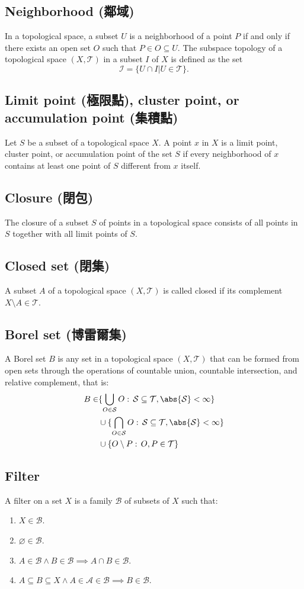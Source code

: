 \documentclass[a4paper,12pt]{article}
\begin{document}
\subsection{Neighborhood (鄰域)}
In a topological space, a subset $U$ is a neighborhood of a point $P$ if and only if there exists an open set $O$ such that $P\in O\subseteq U$.
The subspace topology of a topological space $(X,\mathcal{T})$ in a subset $I$ of $X$ is defined as the set 
\[\mathcal{I}=\{U\cap I | U\in\mathcal{T}\}.\]
\subsection{Limit point (極限點), cluster point, or accumulation point (集積點)}
Let $S$ be a subset of a topological space $X$. A point $x$ in $X$ is a limit point, cluster point, or accumulation point of the set $S$ if every neighborhood of $x$ contains at least one point of $S$ different from $x$ itself.
\subsection{Closure (閉包)}
The closure of a subset $S$ of points in a topological space consists of all points in $S$ together with all limit points of $S$.
\subsection{Closed set (閉集)}
A subset $A$ of a topological space $(X,\mathcal{T})$ is called closed if its complement $X\setminus A\in\mathcal{T}$.
\subsection{Borel set (博雷爾集)}
A Borel set $B$ is any set in a topological space $(X,\mathcal{T})$ that can be formed from open sets through the operations of countable union, countable intersection, and relative complement, that is:
\[\begin{aligned}
B\in &\{\bigcup_{O\in\mathcal{S}}O:\,\mathcal{S}\subseteq\mathcal{T},\abs{\mathcal{S}}<\infty\}\\
& \cup \{\bigcap_{O\in\mathcal{S}}O:\,\mathcal{S}\subseteq\mathcal{T},\abs{\mathcal{S}}<\infty\}\\
& \cup \{O\setminus P:\,O,P\in\mathcal{T}\}
\end{aligned}\]
\subsection{Filter}
A filter on a set $X$ is a family $\mathcal{B}$ of subsets of $X$ such that: 
\begin{enumerate}
\item $X\in\mathcal{B}$.
\item $\varnothing\in\mathcal{B}$.
\item $A\in\mathcal{B}\land B\in\mathcal{B}\implies A\cap B\in\mathcal{B}$.
\item $A\subseteq B\subseteq X\land A\in\mathcal{A}\in\mathcal{B}\implies B\in\mathcal{B}$.
\end{enumerate}
\end{document}
